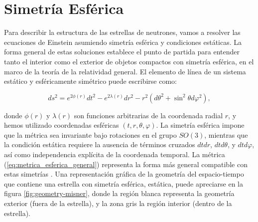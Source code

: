 \section{Simetría Esférica}

Para describir la estructura de las estrellas de neutrones, vamos a resolver las ecuaciones de Einstein asumiendo simetría esférica y condiciones estáticas. La forma general de estas soluciones establece el punto de partida para entender tanto el interior como el exterior de objetos compactos con simetría esférica, en el marco de la teoría de la relatividad general. El elemento de línea de un sistema estático y esféricamente simétrico puede escribirse como:

\begin{equation}
	ds^2 = e^{2\phi(r)}dt^2 - e^{2\lambda(r)}dr^2 - r^2(d\theta^2 + \sin^2\theta d\varphi^2),
	\label{eq:metrica_esferica_general}
\end{equation}

donde $\phi(r)$ y $\lambda(r)$ son funciones arbitrarias de la coordenada radial $r$, y hemos utilizado coordenadas esféricas $(t,r,\theta,\varphi)$. La simetría esférica impone que la métrica sea invariante bajo rotaciones en el grupo $SO(3)$, mientras que la condición estática requiere la ausencia de términos cruzados $dt dr$, $dt d\theta$, y $dt d\varphi$, así como independencia explícita de la coordenada temporal. La métrica (\ref{eq:metrica_esferica_general}) representa la forma más general compatible con estas simetrías \cite{misnerGravitation2017}. Una representación gráfica de la geometría del espacio-tiempo que contiene una estrella con simetría esférica, estática, puede apreciarse en la figura \ref{fig:geometry-misner}, donde la región blanca representa la geometría exterior (fuera de la estrella), y la zona gris la región interior (dentro de la estrella).


%
%
%
%
%

